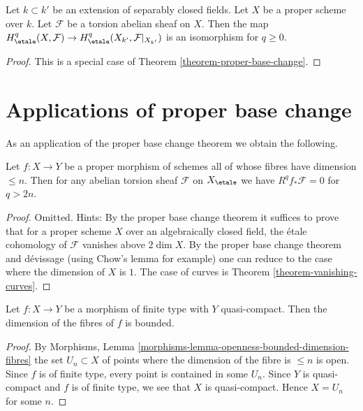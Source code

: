\begin{lemma}
\label{lemma-base-change-separably-closed}
Let $k \subset k'$ be an extension of separably closed fields.
Let $X$ be a proper scheme over $k$.
Let $\mathcal{F}$ be a torsion abelian sheaf on $X$.
Then the map $H^q_\etale(X, \mathcal{F}) \to
H^q_\etale(X_{k'}, \mathcal{F}|_{X_{k'}})$ is an isomorphism
for $q \geq 0$.
\end{lemma}

\begin{proof}
This is a special case of Theorem \ref{theorem-proper-base-change}.
\end{proof}






\section{Applications of proper base change}
\label{section-applications-proper-base-change}

\noindent
As an application of the proper base change theorem we obtain the following.

\begin{lemma}
\label{lemma-cohomological-dimension-proper}
Let $f : X \to Y$ be a proper morphism of schemes
all of whose fibres have dimension $\leq n$.
Then for any abelian torsion sheaf $\mathcal{F}$ on $X_\etale$
we have $R^qf_*\mathcal{F} = 0$ for $q > 2n$.
\end{lemma}

\begin{proof}
Omitted. Hints: By the proper base change theorem it suffices to
prove that for a proper scheme $X$ over an algebraically closed
field, the \'etale cohomology of $\mathcal{F}$ vanishes
above $2\dim X$. By the proper base change theorem and d\'evissage
(using Chow's lemma for example)
one can reduce to the case where the dimension of $X$ is $1$.
The case of curves is Theorem \ref{theorem-vanishing-curves}.
\end{proof}

\begin{lemma}
\label{lemma-morphism-finite-type-bounded-dimension}
Let $f : X \to Y$ be a morphism of finite type with $Y$ quasi-compact.
Then the dimension of the fibres of $f$ is bounded.
\end{lemma}

\begin{proof}
By Morphisms, Lemma \ref{morphisms-lemma-openness-bounded-dimension-fibres}
the set $U_n \subset X$ of points where the dimension of the fibre
is $\leq n$ is open. Since $f$ is of finite type, every point is
contained in some $U_n$. Since $Y$ is quasi-compact and $f$ is of
finite type, we see that $X$ is quasi-compact. Hence $X = U_n$ for
some $n$.
\end{proof}


















